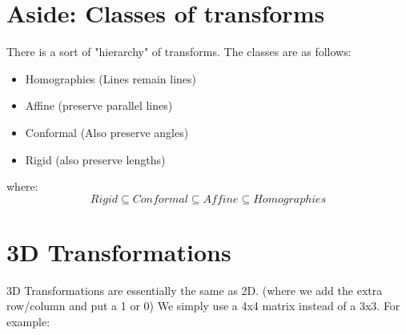 \documentclass[12pt]{article}
\theoremstyle{definition}
\begin{document}
\section{Aside: Classes of transforms}
There is a sort of "hierarchy" of transforms. The classes are as follows:
\begin{itemize}
	\item Homographies (Lines remain lines)
	\item Affine (preserve parallel lines)
	\item Conformal (Also preserve angles)
	\item Rigid (also preserve lengths)
\end{itemize}
where: $$ Rigid \subseteq Conformal \subseteq Affine \subseteq Homographies$$

\section{3D Transformations}
3D Transformations are essentially the same as 2D. (where we add the extra row/column and put a 1 or 0) We simply use a 4x4 matrix instead of a 3x3. For example:
\end{document}
